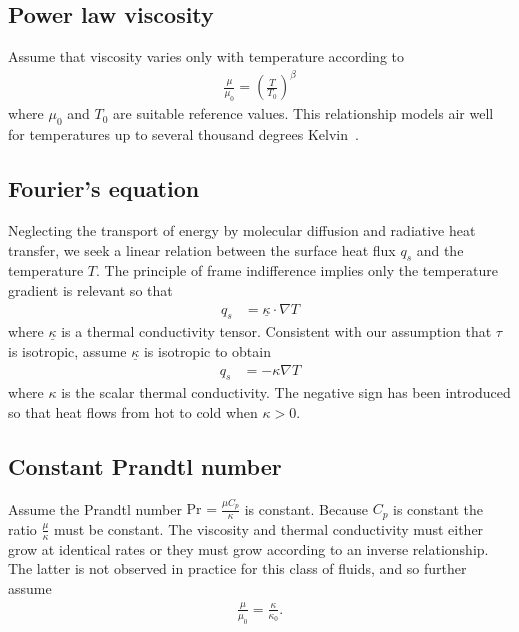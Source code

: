 \documentclass[letterpaper,11pt,nointlimits,reqno,draft]{amsbook}
\newcommand{\Prandtl}[1][]{\ensuremath{\mbox{Pr}_{#1}}}
\begin{document}
\subsection{Power law viscosity}

Assume that viscosity varies only with temperature according to
\begin{align}
\label{eq:powerlawviscosity}
\frac{\mu}{\mu_{0}}=\left(\frac{T}{T_{0}}\right)^{\beta}
\end{align}
where $\mu_{0}$ and $T_{0}$ are suitable reference values.  This
relationship models air well for temperatures up to several thousand
degrees Kelvin~\citep{NASA-TR-R-132}.

\subsection{Fourier's equation}

Neglecting the transport of energy by molecular diffusion and radiative heat
transfer, we seek a linear relation between the surface heat flux $q_{s}$ and
the temperature $T$.  The principle of frame indifference implies only the
temperature gradient is relevant so that
\begin{align}
  \label{eq:fouriertensorlaw}
  q_{s} &= \underline{\kappa} \cdot \nabla{} T
\end{align}
where $\underline{\kappa}$ is a thermal conductivity tensor.
Consistent with our assumption that $\tau$ is isotropic, assume
$\underline{\kappa}$ is isotropic to obtain
\begin{align}
  \label{eq:fourierlaw}
  q_{s} &= - \kappa \nabla{} T
\end{align}
where $\kappa$ is the scalar thermal conductivity.  The negative sign has been
introduced so that heat flows from hot to cold when $\kappa>0$.

\subsection{Constant Prandtl number}

Assume the Prandtl number $\Prandtl = \frac{\mu{}C_{p}}{\kappa}$ is constant.
Because $C_{p}$ is constant the ratio $\frac{\mu}{\kappa}$ must be
constant.  The viscosity and thermal conductivity must either grow at
identical rates or they must grow according to an inverse relationship.
The latter is not observed in practice for this class of fluids, and
so further assume
\begin{align}
  \frac{\mu}{\mu_{0}} = \frac{\kappa}{\kappa_{0}}
  .
  \label{eq:mukappa}
\end{align}
\end{document}
